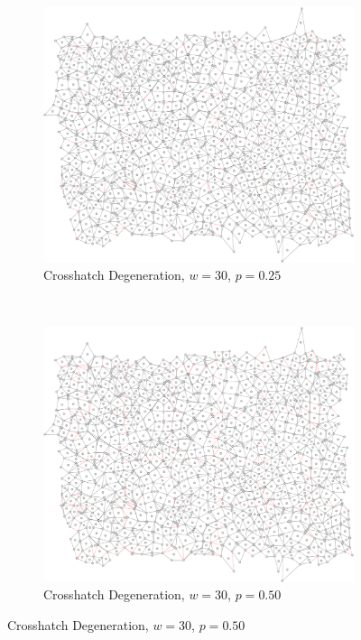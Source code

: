 \documentclass[a4paper,11pt,twoside]{report}
\begin{document}
\begin{figure}[htp]
\centering
\begin{subfigure}[t]{0.4\textwidth}
  \includegraphics[width=\textwidth]{ch6_figs/cross_hatch_p25_w30}
  \caption{Crosshatch Degeneration, $w=30$, $p=0.25$}

\end{subfigure}
~
\begin{subfigure}[t]{0.4\textwidth}
  \centering
  \includegraphics[width=\textwidth]{ch6_figs/cross_hatch_p50_w30}
  \caption{Crosshatch Degeneration, $w=30$, $p=0.50$}


\end{subfigure}
\end{figure}
\end{document}
